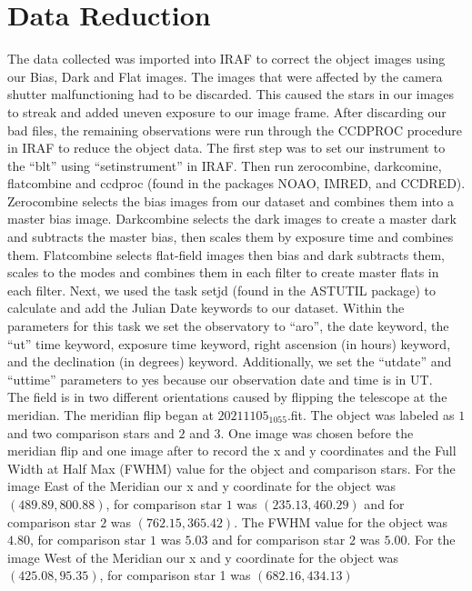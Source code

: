\section{Data Reduction}
\label{sec:data}

The data collected was imported into IRAF to correct the object images using our Bias, 
Dark and Flat images. The images that were affected by the camera shutter malfunctioning 
had to be discarded. This caused the stars in our images to streak and added uneven exposure 
to our image frame. After discarding our bad files, the remaining observations were run 
through the CCDPROC procedure in IRAF to reduce the object data. The first step was to 
set our instrument to the “blt” using “setinstrument” in IRAF. Then run zerocombine, 
darkcomine, flatcombine and ccdproc (found in the packages NOAO, IMRED, and CCDRED). 
Zerocombine selects the bias images from our dataset and combines them into a master 
bias image. Darkcombine selects the dark images to create a master dark and subtracts 
the master bias, then scales them by exposure time and combines them. Flatcombine selects 
flat-field images then bias and dark subtracts them, scales to the modes and combines 
them in each filter to create master flats in each filter. Next, we used the task setjd 
(found in the ASTUTIL package) to calculate and add the Julian Date keywords to our dataset. 
Within the parameters for this task we set the observatory to “aro”, the date keyword, the 
“ut” time keyword, exposure time keyword, right ascension (in hours) keyword, and the declination 
(in degrees) keyword. Additionally, we set the “utdate” and “uttime” parameters to yes 
because our observation date and time is in UT. \\
\noindent The field is in two different orientations caused by flipping the telescope at the meridian. 
The meridian flip began at $20211105_ 1055$.fit. The object was labeled as $1$ and two comparison 
stars and $2$ and $3$. One image was chosen before the meridian flip and one image after to record
the x and y coordinates and the Full Width at Half Max (FWHM) value for the object and 
comparison stars. For the image East of the Meridian our x and y coordinate for the 
object was $(489.89, 800.88)$, for comparison star $1$ was $(235.13, 460.29)$ and for comparison 
star $2$ was $(762.15, 365.42)$. The FWHM value for the object was $4.80$, for comparison star 
$1$ was $5.03$ and for comparison star $2$ was $5.00$. For the image West of the Meridian our x and 
y coordinate for the object was $(425.08, 95.35)$, for comparison star 1 was $(682.16, 434.13)$ 
